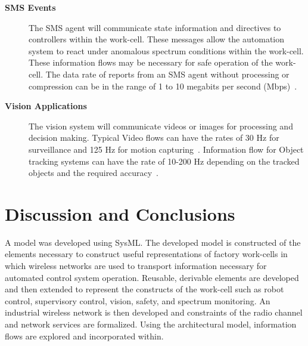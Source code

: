 \begin{description}
	\item[\textbf{SMS Events}] The SMS agent will communicate state information and directives to controllers within the work-cell.  These messages allow the automation system to react under anomalous spectrum conditions within the work-cell. These information flows may be necessary for safe operation of the work-cell. The data rate of reports from an SMS agent without processing or compression can be in the range of 1 to 10 megabits per second (Mbps)~\cite{cuevas_2015}.
	
	\item[\textbf{Vision Applications}] The vision system will communicate videos or images for processing and decision making. Typical Video flows can have the rates of 30 Hz for surveillance and 125 Hz for motion capturing~\cite{industrialCCTV, ELWeiss}. Information flow for Object tracking systems can have the rate of 10-200 Hz depending on the tracked objects and the required accuracy~\cite{lidar, motioncapture}. 
\end{description}



\section{Discussion and Conclusions}\label{sysml:sec:conclusion}
A model was developed using SysML. The developed model is constructed of the elements necessary to construct useful representations of factory work-cells in which wireless networks are used to transport information necessary for automated control system operation.  Reusable, derivable elements are developed and then extended to represent the constructs of the work-cell such as robot control, supervisory control, vision, safety, and spectrum monitoring.  An industrial wireless network is then developed and constraints of the radio channel and network services are formalized. Using the architectural model, information flows are explored and incorporated within. 

